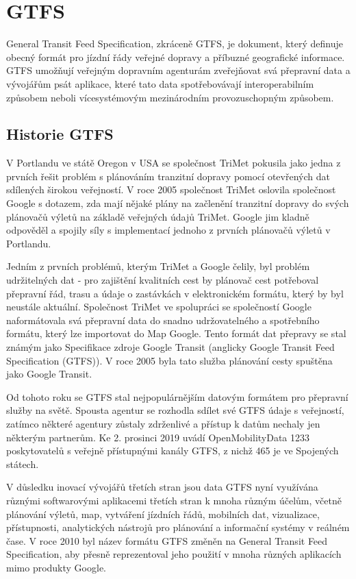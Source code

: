 \chapter{GTFS}
\label{2-teorie-gtfs}

General Transit Feed Specification, zkráceně GTFS, je dokument, který definuje
obecný formát pro jízdní řády veřejné dopravy a příbuzné geografické informace.
GTFS  umožňují veřejným dopravním agenturám zveřejňovat svá přepravní
data a vývojářům psát aplikace, které tato data spotřebovávají interoperabilním
způsobem neboli vícesystémovým mezinárodním provozuschopným způsobem. \cite{gtfs-info}

\section{Historie GTFS}
V Portlandu ve státě Oregon v USA se společnost TriMet pokusila jako jedna z prvních 
řešit problém s plánováním tranzitní dopravy pomocí otevřených dat sdílených širokou veřejností.
V roce 2005 společnost TriMet oslovila společnost Google s dotazem, zda mají nějaké plány
na začlenění tranzitní dopravy do svých plánovačů výletů na základě veřejných údajů TriMet.
Google jim kladně odpověděl a spojily síly s implementací jednoho z prvních plánovačů výletů v Portlandu.

Jedním z prvních problémů, kterým TriMet a Google čelily, byl problém udržitelných dat
- pro zajištění kvalitních cest by plánovač cest potřeboval přepravní řád, 
trasu a údaje o zastávkách v elektronickém formátu, který by byl neustále aktuální. 
Společnost TriMet ve spolupráci se společností Google naformátovala svá přepravní 
data do snadno udržovatelného a spotřebního formátu, který lze importovat do Map Google. 
Tento formát dat přepravy se stal známým jako Specifikace zdroje Google Transit (anglicky
Google Transit Feed Specification (GTFS)). 
V roce 2005 byla tato služba plánování cesty spuštěna jako Google Transit.

Od tohoto roku se GTFS stal nejpopulárnějším datovým formátem pro přepravní služby na světě. 
Spousta agentur se rozhodla sdílet své GTFS údaje s veřejností, zatímco některé agentury 
zůstaly zdrženlivé a přístup k datům nechaly jen některým partnerům. Ke 2. prosinci 2019
uvádí OpenMobilityData 1233 poskytovatelů s veřejně přístupnými kanály GTFS,
z nichž 465 je ve Spojených státech. 

V důsledku inovací vývojářů třetích stran jsou data GTFS nyní využívána různý\-mi softwarovými aplikacemi
třetích stran k mnoha různým účelům, včetně plánování výletů, map, vytváření jízdních řádů, mobilních dat,
vizualizace, přístupnosti, analytických nástrojů pro plánování a informační systémy v reálném čase.
V roce 2010 byl název formátu GTFS změněn na General Transit Feed Specification,
aby přesně reprezentoval jeho použití v mnoha různých aplikacích mimo produkty Google. \cite{transitwiki} 
 
